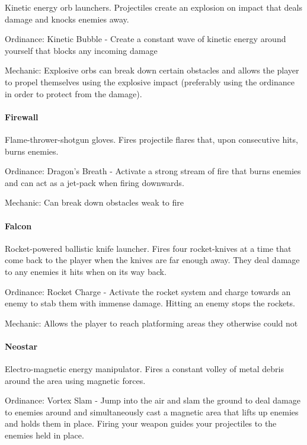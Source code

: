 \documentclass[../Main.tex]{subfiles}
\begin{document}
Kinetic energy orb launchers. Projectiles create an explosion on impact that deals damage and knocks enemies away. 

Ordinance: Kinetic Bubble - Create a constant wave of kinetic energy around yourself that blocks any incoming damage

Mechanic: Explosive orbs can break down certain obstacles and allows the player to propel themselves using the explosive impact (preferably using the ordinance in order to protect from the damage).

\paragraph{Firewall}

Flame-thrower-shotgun gloves. Fires projectile flares that, upon consecutive hits, burns enemies.

Ordinance: Dragon's Breath - Activate a strong stream of fire that burns enemies and can act as a jet-pack when firing downwards.

Mechanic: Can break down obstacles weak to fire

\paragraph{Falcon}

Rocket-powered ballistic knife launcher. Fires four rocket-knives at a time that come back to the player when the knives are far enough away. They deal damage to any enemies it hits when on its way back.

Ordinance: Rocket Charge - Activate the rocket system and charge towards an enemy to stab them with immense damage. Hitting an enemy stops the rockets. 

Mechanic: Allows the player to reach platforming areas they otherwise could not

\paragraph{Neostar}

Electro-magnetic energy manipulator. Fires a constant volley of metal debris around the area using magnetic forces.

Ordinance: Vortex Slam - Jump into the air and slam the ground to deal damage to enemies around and simultaneously cast a magnetic area that lifts up enemies and holds them in place. Firing your weapon guides your projectiles to the enemies held in place.
\end{document}
